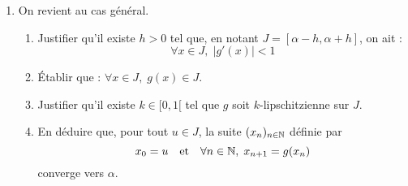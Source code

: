 \begin{enumerate}
  \item On revient au cas général.
  \begin{enumerate}
    \item Justifier qu'il existe $h>0$ tel que, en notant $J=[\alpha-h,\alpha+h]$, on ait :
\begin{displaymath}
  \forall x\in J,\; |g'(x)|<1
\end{displaymath}
    \item \'Etablir que :  $\forall x\in J,\; g(x)\in J$.
    \item Justifier qu'il existe $k\in[0,1[$ tel que $g$ soit $k$-lipschitzienne sur $J$.
    \item En déduire que, pour tout $u\in J$, la suite $(x_n)_{n\in \mathbb{N}}$ définie par 
\begin{displaymath}
x_0=u\quad\text{et}\quad \forall n\in\mathbb{N},\; x_{n+1}=g(x_n)  
\end{displaymath}
converge vers $\alpha$.
  \end{enumerate}
\end{enumerate}
